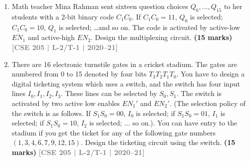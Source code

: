 \documentclass[12pt,a3paper]{article}
\newcommand{\yr}[1]{\hfill\textcolor{gray}{\small\textbf{[#1]}}}
\newcommand{\mk}[1]{\textcolor{orange!70!black}{\small\textbf{(#1 marks)}}}
\begin{document}
\begin{enumerate}
\begin{center}
\end{center}

\mk{12} \yr{CSE 205 | L-2/T-1 | 2021--22}

\item Math teacher Mina Rahman sent sixteen question choices $Q_0,\ldots,Q_{15}$ to her students with a 2-bit binary code $C_1C_0$. If $C_1C_0=11$, $Q_0$ is selected; $C_1C_0=10$, $Q_1$ is selected; \ldots and so on. The code is activated by active-low $\overline{EN_1}$ and active-high $EN_2$. Design the multiplexing circuit.
\mk{15} \yr{CSE 205 | L-2/T-1 | 2020--21}

\item There are 16 electronic turnstile gates in a cricket stadium. The gates are numbered from 0 to 15 denoted by four bits $T_3T_2T_1T_0$. You have to design a digital ticketing system which uses a switch, and the switch has four input lines $I_0, I_1, I_2, I_3$. These lines can be selected by $S_0, S_1$. The switch is activated by two active low enables $EN_1'$ and $EN_2'$. (The selection policy of the switch is as follows. If $S_1S_0 = 00$, $I_0$ is selected; if $S_1S_0 = 01$, $I_1$ is selected; if $S_1S_0 = 10$, $I_2$ is selected; ... so on.). You can have entry to the stadium if you get the ticket for any of the following gate numbers $(1, 3, 4, 6, 7, 9, 12, 15)$. Design the ticketing circuit using the switch.
\mk{15} \yr{CSE 205 | L-2/T-1 | 2020--21}


\end{enumerate}
\end{document}
